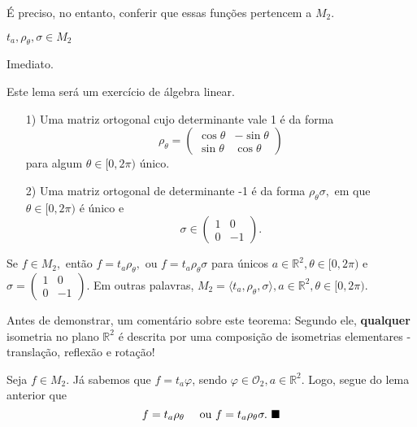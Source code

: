 \documentclass[algebra_notes.tex]{subfiles}
\begin{document}
É preciso, no entanto, conferir que essas funções pertencem a $M_{2}.$
\begin{lemma*}
	$t_{a},\rho_{\theta },\sigma \in M_{2}$
\end{lemma*}
\begin{proof*}
	Imediato. \qedsymbol
\end{proof*}
\begin{lemma*}
	Este lema será um exercício de álgebra linear.
	\begin{itemize}
		\item[1)] Uma matriz ortogonal cujo determinante vale 1 é da forma
		      $$
			      \rho_{\theta } = \begin{pmatrix}
				      \cos{\theta } & -\sin{\theta } \\
				      \sin{\theta } & \cos{\theta }
			      \end{pmatrix}
		      $$
		      para algum $\theta \in[0,2\pi )$ único.
		\item[2)] Uma matriz ortogonal de determinante -1 é da forma $\rho_{\theta }\sigma ,$ em que $\theta \in[0, 2\pi)$ é único e
		      $$
			      \sigma \in \begin{pmatrix}
				      1 & 0  \\
				      0 & -1
			      \end{pmatrix}.
		      $$
	\end{itemize}
\end{lemma*}
\begin{theorem*}
	Se $f\in M_{2},$ então $f=t_{a}\rho_{\theta },$ ou $f = t_{a}\rho_{\theta }\sigma  $ para únicos $a\in \mathbb{R}^{2},\theta \in[0,2\pi)$
	e $\sigma = \begin{pmatrix}
			1 & 0  \\
			0 & -1
		\end{pmatrix}$. Em outras palavras, $M_{2} = \langle t_{a}, \rho_{\theta }, \sigma \rangle, a \in \mathbb{R}^{2}, \theta \in[0,2\pi).$
\end{theorem*}
Antes de demonstrar, um comentário sobre este teorema: Segundo ele, \textbf{qualquer} isometria no plano $\mathbb{R}^{2}$ é
descrita por uma composição de isometrias elementares - translação, reflexão e rotação!
\begin{proof*}
	Seja $f\in M_{2}.$ Já sabemos que $f = t_{a}\varphi $, sendo $\varphi \in \mathcal{O}_{2}, a\in \mathbb{R}^{2}.$ Logo, segue do lema
	anterior que
	$$
		f = t_{a}\rho _{\theta }\quad\text{ ou } f = t_{a}\rho_{\theta }\sigma . \text{ $\blacksquare$}
	$$
\end{proof*}
\end{document}
